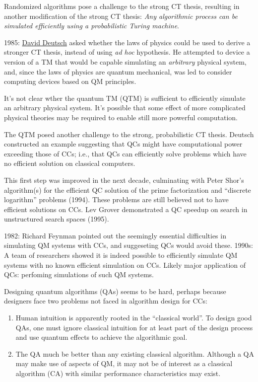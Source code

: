 \documentclass{article}
\numberwithin{equation}{section}
\begin{document}
Randomized algorithms pose a challenge to the strong CT thesis, resulting in another modification of the strong CT thesis: \textit{Any algorithmic process can be simulated efficiently using a probabilistic Turing machine}.

1985: \href{https://en.wikipedia.org/wiki/David_Deutsch}{David Deutsch} asked whether the laws of physics could be used to derive a stronger CT thesis, instead of using \textit{ad hoc} hypothesis. He attempted to device a version of a TM that would be capable simulating an \textit{arbitrary} physical system, and, since the laws of physics are quantum mechanical, was led to consider computing devices based on QM principles.

It's not clear wther the quantum TM (QTM) is sufficient to efficiently simulate an arbitrary physical system. It's possible that some effect of more complicated physical theories may be required to enable still more powerful computation.

The QTM posed another challenge to the strong, probabilistic CT thesis. Deutsch constructed an example suggesting that QCs might have computational power exceeding those of CCs; i.e., that QCs can efficiently solve problems which have no efficient solution on classical computers.

This first step was improved in the next decade, culminating with Peter Shor's algorithm(s) for the efficient QC solution of the prime factorization and ``discrete logarithm'' problems (1994). These problems are still believed not to have efficient solutions on CCs. Lev Grover demonstrated a QC speedup on search in unstructured search spaces (1995).

1982: Richard Feynman pointed out the seemingly essential difficulties in simulating QM systems with CCs, and suggeseting QCs would avoid these. 1990s: A team of researchers showed it is indeed possible to efficiently simulate QM systems with no known efficient simulation on CCs. Likely major application of QCs: perfoming simulations of such QM systems.

Designing quantum algorithms (QAs) seems to be hard, perhaps because designers face two problems not faced in algorithm design for CCs:

\begin{enumerate}
\item Human intuition is apparently rooted in the ``classical world''. To design good QAs, one must ignore classical intuition for at least part of the design process and use quantum effects to achieve the algorithmic goal.
\item The QA much be better than any existing classical algorithm. Although a QA may make use of aspects of QM, it may not be of interest as a classical algorithm (CA) with similar performance characteristics may exist.
\end{enumerate}
\end{document}
